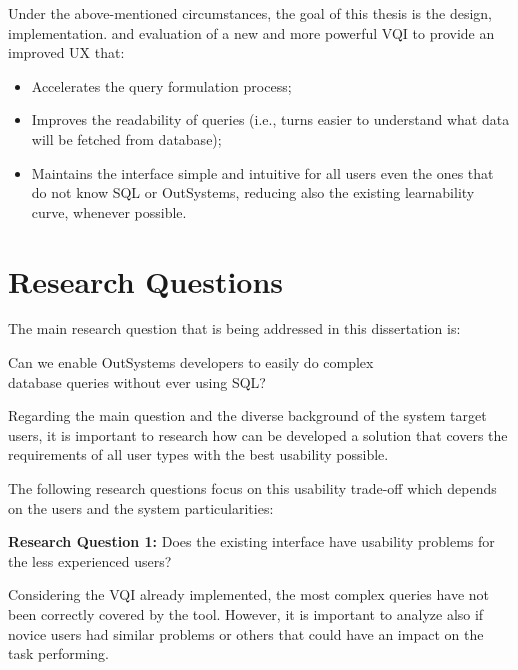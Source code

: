 Under the above-mentioned circumstances, the goal of this thesis is the design, implementation. and evaluation of a new and more powerful \gls{VQI} to provide an improved \gls{UX} that: 

\begin{itemize}
  \item Accelerates the query formulation process;
  \item Improves the readability of queries (i.e., turns easier to understand what data will be fetched from database);
  \item Maintains the interface simple and intuitive for all users even the ones that do not know SQL or OutSystems, reducing also the existing learnability curve, whenever possible.
\end{itemize}


\section{Research Questions}
\label{sec:research_questions}
The main research question that is being addressed in this dissertation is: 

\begin{center}
  Can we enable OutSystems developers to easily do complex \\ database queries without ever using \gls{SQL}?
\end{center}

Regarding the main question and the diverse background of the system target users, it is important to research how can be developed a solution that covers the requirements of all user types with the best usability possible.

The following research questions focus on this usability trade-off which depends on the users and the system particularities:

\medskip

\textbf{Research Question 1:} Does the existing interface have usability problems for the less experienced users?

\medskip

Considering the \gls{VQI} already implemented, the most complex queries have not been correctly covered by the tool. However, it is important to analyze also if novice users had similar problems or others that could have an impact on the task performing.

\medskip

